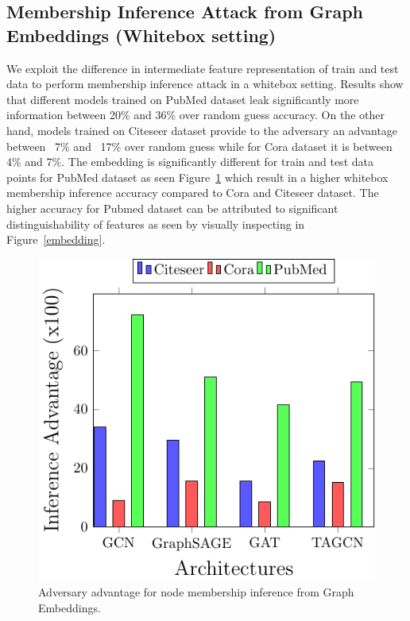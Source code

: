 \subsection{Membership Inference Attack from Graph Embeddings {\large(Whitebox setting)}}

We exploit the difference in intermediate feature representation of train and test data to perform membership inference attack in a whitebox setting.
Results show that different models trained on PubMed dataset leak significantly more information between 20\% and 36\% over random guess accuracy.
On the other hand, models trained on Citeseer dataset provide to the adversary an advantage between ~7\% and ~17\% over random guess while for Cora dataset it is between 4\% and 7\%.
The embedding is significantly different for train and test data points for PubMed dataset as seen Figure~\ref{fig:whitebox} which result in a higher whitebox membership inference accuracy compared to Cora and Citeseer dataset.
The higher accuracy for Pubmed dataset can be attributed to significant distinguishability of features as seen by visually inspecting in Figure~\ref{embedding}.

\begin{figure}
  \begin{center}
    \includegraphics[width=\linewidth]{figures/EmbeddingMIA/whiteboxMIA.pdf}
  \end{center}
  \caption{Adversary advantage for node membership inference from Graph Embeddings.}
  \label{fig:whitebox}
\end{figure}



